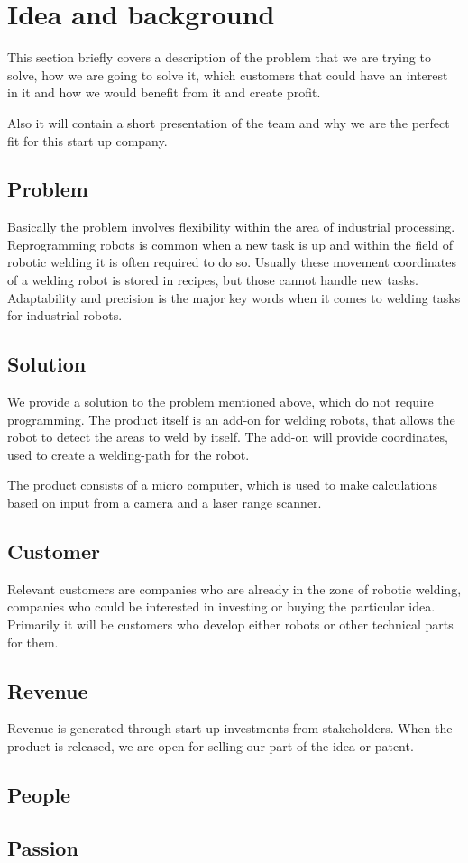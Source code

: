 

\section{Idea and background}
This section briefly covers a description of the problem that we are trying to solve, how we are going to solve it, which customers that could have an interest in it and how we would benefit from it and create profit.

Also it will contain a short presentation of the team and why we are the perfect fit for this start up company.

\subsection{Problem}
Basically the problem involves flexibility within the area of industrial processing. Reprogramming robots is common when a new task is up and within the field of robotic welding it is often required to do so. Usually these movement coordinates of a welding robot is stored in recipes, but those cannot handle new tasks. Adaptability and precision is the major key words when it comes to welding tasks for industrial robots.

\subsection{Solution}
We provide a solution to the problem mentioned above, which do not require programming. The product itself is an add-on for welding robots, that allows the robot to detect the areas to weld by itself. The add-on will provide coordinates, used to create a welding-path for the robot. 

The product consists of a micro computer, which is used to make  calculations based on input from a camera and a laser range scanner. 

\subsection{Customer}
Relevant customers are companies who are already in the zone of robotic welding, companies who could be interested in investing or buying the particular idea. Primarily it will be customers who develop either robots or other technical parts for them.  

\subsection{Revenue}
Revenue is generated through start up investments from stakeholders. When the product is released, we are open for selling our part of the idea or patent. 

\subsection{People}


\subsection{Passion}


